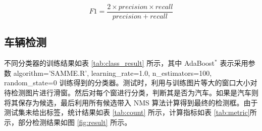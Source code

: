 \begin{equation}
	F1 = \frac{2\times precision \times recall}{precision + recall}
\end{equation}

\subsection{车辆检测}

不同分类器的训练结果如表 \ref{tab:class_result} 所示，其中 AdaBoost$^*$ 表示采用参数 algorithm='SAMME.R', learning\_rate=1.0, n\_estimators=100, random\_state=0 训练得到的分类器。测试时，利用与训练图片等大的窗口大小对待检测图片进行滑窗。然后对每个窗进行分类，判断其是否为汽车。如果是汽车则将其保存为候选，最后利用所有候选带入 NMS 算法计算得到最终的检测框。由于测试集未给出标签，统计结果如表 \ref{tab:count} 所示，计算指标如表 \ref{tab:metric}所示，部分检测结果如图 \ref{fig:result} 所示。

